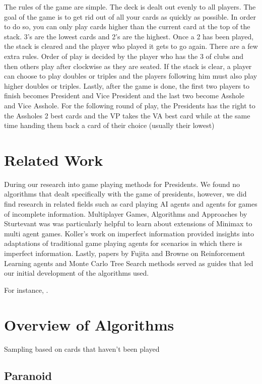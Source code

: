 \documentclass[11pt]{article}
\begin{document}
The rules of the game are simple. The deck is dealt out evenly to all players. The goal of the game is to get rid out of all your cards as quickly as possible. In order to do so, you can only play cards higher than the current card at the top of the stack. 3's are the lowest cards and 2's are the highest. Once a 2 has been played, the stack is cleared and the player who played it gets to go again. There are a few extra rules. Order of play is decided by the player who has the 3 of clubs and then others play after clockwise as they are seated. If the stack is clear, a player can choose to play doubles or triples and the players following him must also play higher doubles or triples. Lastly, after the game is done, the first two players to finish becomes President and Vice President and the last two become Asshole and Vice Asshole. For the following round of play, the Presidents has the right to the Assholes 2 best cards and the VP takes the VA best card while at the same time handing them back a card of their choice (usually their lowest)

\section{Related Work}

During our research into game playing methods for Presidents. We found no algorithms that dealt specifically with the game of presidents, however, we did find research in related fields such as card playing AI agents and agents for games of incomplete information.  Multiplayer Games, Algorithms and Approaches by Sturtevant was was particularly helpful to learn about extensions of Minimax to multi agent games. Koller's work on imperfect information provided insights into adaptations of traditional game playing agents for scenarios in which there is imperfect information. Lastly, papers by Fujita and Browne on Reinforcement Learning agents and Monte Carlo Tree Search methods served as guides that led our initial development of the algorithms used.

For instance, \cite{hochreiter1997long}.


\section{Overview of Algorithms}

Sampling based on cards that haven't been played

\subsection{Paranoid}
\end{document}
